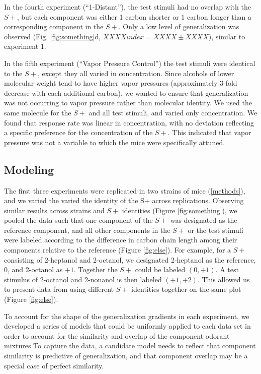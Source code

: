 In the fourth experiment (``1-Distant''), the test stimuli had no overlap with the $S+$, but each component was either 1 carbon shorter or 1 carbon longer than a corresponding component in the $S+$.  Only a low level of generalization was observed (Fig. \ref{fig:something}d, $XXXX index = XXXX \pm XXXX$), similar to experiment 1.  

In the fifth experiment (``Vapor Pressure Control'') the test stimuli were identical to the $S+$, except they all varied in concentration.  Since alcohols of lower molecular weight tend to have higher vapor pressures (approximately 3-fold decrease with each additional carbon), we wanted to ensure that generalization was not occurring to vapor pressure rather than molecular identity.  We used the same molecule for the $S+$ and all test stimuli, and varied only concentration.  We found that response rate was linear in concentration, with no deviation reflecting a specific preference for the concentration of the $S+$.  This indicated that vapor pressure was not a variable to which the mice were specifically attuned.  

\subsection{Modeling}

The first three experiments were replicated in two strains of mice (\ref{methods}), and we varied the varied the identity of the S+ across replications.  Observing similar results across strains and $S+$ identities (Figure \ref{fig:something}), we pooled the data such that one component of the $S+$ was designated as the reference component, and all other components in the $S+$ or the test stimuli were labeled according to the difference in carbon chain length among their components relative to the reference (Figure \ref{fig:else}).  For example, for a $S+$ consisting of 2-heptanol and 2-octanol, we designated 2-heptanol as the reference, $0$, and 2-octanol as $+1$.  Together the $S+$ could be labeled $(0,+1)$.  A test stimulus of 2-octanol and 2-nonanol is then labeled $(+1,+2)$.  This allowed us to present data from using different $S+$ identities together on the same plot (Figure \ref{fig:else}).  

To account for the shape of the generalization gradients in each experiment, we developed a series of models that could be uniformly applied to each data set in order to account for  the similarity and overlap of the component odorant mixtures  To capture the data, a candidate model needs to reflect that component similarity is predictive of generalization, and that component overlap may be a special case of perfect similarity.  

